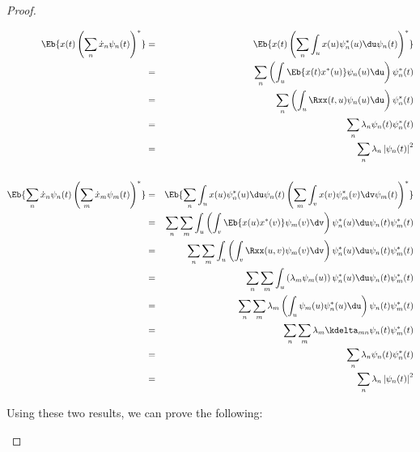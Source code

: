 \begin{proof}
\begin{enumerate}
\begin{eqnarray*}
   \Eb{x(t) \left(\sum_n \dot{x}_n \psi_n(t)\right)^\ast}
     &=& \Eb{x(t) \left(\sum_n \int_u x(u)\psi_n^\ast(u)\du \psi_n(t)\right)^\ast}
   \\&=&  \sum_n \left(\int_u \Eb{x(t)x^\ast(u)}\psi_n(u)\du\right) \psi_n^\ast(t)
   \\&=&  \sum_n \left(\int_u \Rxx(t,u)\psi_n(u)\du\right) \psi_n^\ast(t)
   \\&=&  \sum_n \lambda_n\psi_n(t) \psi_n^\ast(t)
   \\&=&  \sum_n \lambda_n \left|\psi_n(t) \right|^2
\\ \\
   \Eb{\sum_n \dot{x}_n \psi_n(t)\left(\sum_m \dot{x}_m \psi_m(t)\right)^\ast}
     &=& \Eb{\sum_n \int_u x(u)\psi_n^\ast(u)\du   \psi_n(t)\left(\sum_m \int_v x(v)\psi_m^\ast(v)\dv \psi_m(t)\right)^\ast}
   \\&=& \sum_n\sum_m \int_u\left(\int_v \Eb{x(u)x^\ast(v)}\psi_m(v)\dv\right) \psi_n^\ast(u)\du   \psi_n(t)   \psi_m^\ast(t)
   \\&=& \sum_n\sum_m \int_u\left(\int_v \Rxx(u,v)\psi_m(v)\dv\right) \psi_n^\ast(u)\du   \psi_n(t)   \psi_m^\ast(t)
   \\&=& \sum_n\sum_m \int_u\left(\lambda_m\psi_m(u)\right) \psi_n^\ast(u)\du   \psi_n(t)   \psi_m^\ast(t)
   \\&=& \sum_n\sum_m \lambda_m \left(\int_u \psi_m(u) \psi_n^\ast(u)\du \right)   \psi_n(t)   \psi_m^\ast(t)
   \\&=& \sum_n\sum_m \lambda_m \kdelta_{mn}   \psi_n(t)   \psi_m^\ast(t)
   \\&=& \sum_n \lambda_n   \psi_n(t)   \psi_n^\ast(t)
   \\&=& \sum_n \lambda_n  \left| \psi_n(t) \right|^2
\end{eqnarray*}


Using these two results, we can prove the following:


\end{enumerate}
\end{proof}
